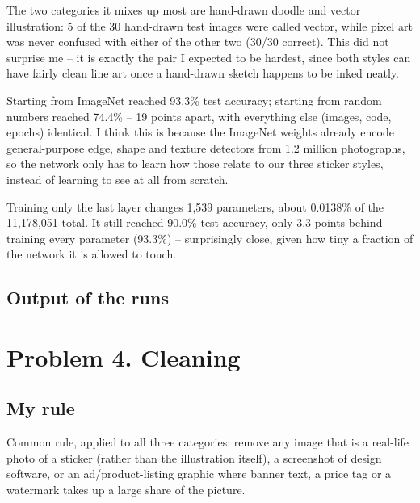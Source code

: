 \documentclass[11pt]{article}
\begin{document}
\begin{center}\end{center}

The two categories it mixes up most are hand-drawn doodle and vector
illustration: 5 of the 30 hand-drawn test images were called vector, while
pixel art was never confused with either of the other two (30/30 correct).
This did not surprise me -- it is exactly the pair I expected to be hardest,
since both styles can have fairly clean line art once a hand-drawn sketch
happens to be inked neatly.

Starting from ImageNet reached 93.3\% test accuracy; starting from random
numbers reached 74.4\% -- 19 points apart, with everything else (images,
code, epochs) identical. I think this is because the ImageNet weights
already encode general-purpose edge, shape and texture detectors from 1.2
million photographs, so the network only has to learn how those relate to
our three sticker styles, instead of learning to see at all from scratch.

Training only the last layer changes 1,539 parameters, about 0.0138\% of the
11,178,051 total. It still reached 90.0\% test accuracy, only 3.3 points
behind training every parameter (93.3\%) -- surprisingly close, given how
tiny a fraction of the network it is allowed to touch.

\subsection*{Output of the runs}

\section*{Problem 4. Cleaning}

\subsection*{My rule}
Common rule, applied to all three categories: remove any image that is a
real-life photo of a sticker (rather than the illustration itself), a
screenshot of design software, or an ad/product-listing graphic where banner
text, a price tag or a watermark takes up a large share of the picture.
\end{document}
